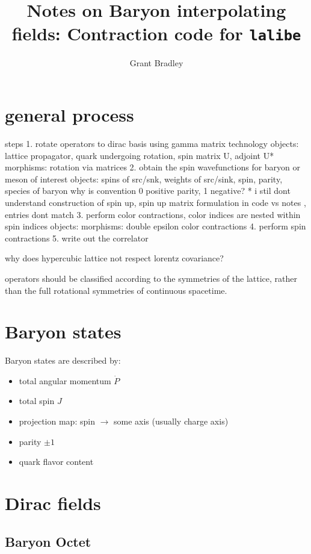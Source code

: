 \documentclass[prd,12pt,superscriptaddress,tightenlines,nofootinbib]{revtex4}
\begin{document}
\title{Notes on Baryon interpolating fields: Contraction code for \texttt{lalibe}}

\author{Grant Bradley}


\maketitle

\section{general process}
steps
1. rotate operators to dirac basis using gamma matrix technology
objects: lattice propagator, quark undergoing rotation, spin matrix U, adjoint U*
morphisms: rotation via matrices 
2. obtain the spin wavefunctions for baryon or meson of interest
objects: spins of src/snk, weights of src/sink, spin, parity, species of baryon
why is convention 0 positive parity, 1 negative? 
* i stil dont understand construction of spin up, spin up matrix formulation in code vs notes , entries dont match
3. perform color contractions, color indices are nested within spin indices 
objects:
morphisms: double epsilon color contractions
4. perform spin contractions 
5. write out the correlator

why does hypercubic lattice not respect lorentz covariance? 

operators should be classified according to the symmetries of the lattice, rather
than the full rotational symmetries of continuous spacetime. 


\section{Baryon states}
Baryon states are described by:
\begin{itemize}
    \item total angular momentum $\dot{P}$
    \item total spin $J$
    \item projection map: spin $\rightarrow$ some axis (usually charge axis)
    \item parity $\pm1$
    \item quark flavor content
\end{itemize}

\section{Dirac fields}

\subsection{Baryon Octet}
\end{document}
